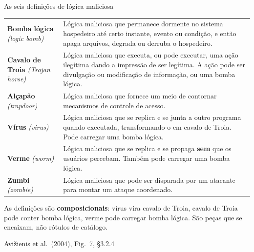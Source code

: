 \documentclass{beamer}
\newcommand{\en}[1]{{\color{depCinza}\textit{#1}}}
\newcommand{\sect}[1]{\par\smallskip\hfill{\tiny\color{black!55}Avi\v{z}ienis et al.\ (2004), #1}}
\begin{document}
\begin{frame}{As seis defini\c{c}\~oes de l\'ogica maliciosa}
    \scriptsize
    \begin{tabularx}{\linewidth}{@{}p{2.5cm} >{\raggedright\arraybackslash}X@{}}
        \toprule
        \textbf{Bomba l\'ogica} \en{(logic bomb)} & L\'ogica maliciosa que permanece dormente no sistema hospedeiro at\'e certo instante, evento ou condi\c{c}\~ao, e ent\~ao apaga arquivos, degrada ou derruba o hospedeiro. \\
        \addlinespace
        \textbf{Cavalo de Troia} \en{(Trojan horse)} & L\'ogica maliciosa que executa, ou pode executar, uma a\c{c}\~ao ileg\'itima dando a impress\~ao de ser leg\'itima. A a\c{c}\~ao pode ser divulga\c{c}\~ao ou modifica\c{c}\~ao de informa\c{c}\~ao, ou uma bomba l\'ogica. \\
        \addlinespace
        \textbf{Al\c{c}ap\~ao} \en{(trapdoor)} & L\'ogica maliciosa que fornece um meio de contornar mecanismos de controle de acesso. \\
        \addlinespace
        \textbf{V\'irus} \en{(virus)} & L\'ogica maliciosa que se replica e se junta a outro programa quando executada, transformando-o em cavalo de Troia. Pode carregar uma bomba l\'ogica. \\
        \addlinespace
        \textbf{Verme} \en{(worm)} & L\'ogica maliciosa que se replica e se propaga \textbf{sem} que os usu\'arios percebam. Tamb\'em pode carregar uma bomba l\'ogica. \\
        \addlinespace
        \textbf{Zumbi} \en{(zombie)} & L\'ogica maliciosa que pode ser disparada por um atacante para montar um ataque coordenado. \\
        \bottomrule
    \end{tabularx}
    \smallskip
    \begin{ancora}
        \scriptsize
        As defini\c{c}\~oes s\~ao \textbf{composicionais}: v\'irus vira cavalo de Troia, cavalo de Troia pode conter bomba l\'ogica, verme pode carregar bomba l\'ogica. S\~ao pe\c{c}as que se encaixam, n\~ao r\'otulos de cat\'alogo.
    \end{ancora}
    \sect{Fig.\ 7, \S3.2.4}
\end{frame}
\end{document}
